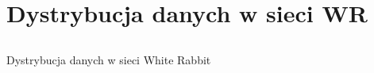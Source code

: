 \documentclass[compress,red]{beamer}
\begin{document}



\section{Dystrybucja danych w sieci WR}
\subsection{}
\begin{frame}{Dystrybucja danych w sieci White Rabbit}

  \begin{center}
     \color{red}{Deterministyczny i niezawodny transfer danych}
  \end{center}

\end{frame}
\end{document}
